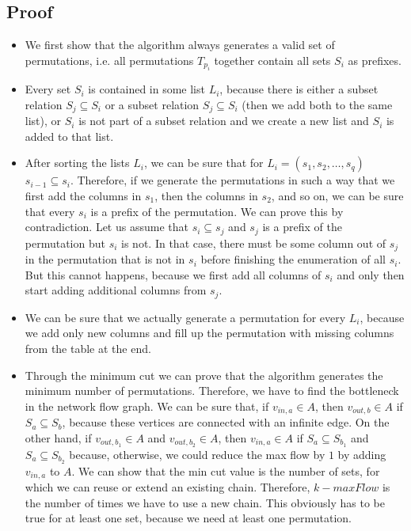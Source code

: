 \documentclass[12pt]{article}
\begin{document}
\subsection*{Proof}
\begin{itemize}
	\item We first show that the algorithm always generates a valid set of permutations, i.e. all permutations $T_{p_i}$ together contain all sets $S_i$ as prefixes.
	\item Every set $S_i$ is contained in some list $L_i$, because there is either a subset relation $S_j \subseteq S_i$ or a subset relation $S_j \subseteq S_i$ (then we add both to the same list), or $S_i$ is not part of a subset relation and we create a new list and $S_i$ is added to that list.
	\item After sorting the lists $L_i$, we can be sure that for $L_i = (s_1, s_2, \ldots, s_q)$ $s_{i-1} \subseteq s_i$. Therefore, if we generate the permutations in such a way that we first add the columns in $s_1$, then the columns in $s_2$, and so on, we can be sure that every $s_i$ is a prefix of the permutation. We can prove this by contradiction. Let us assume that $s_i \subseteq s_j$ and $s_j$ is a prefix of the permutation but $s_i$ is not. In that case, there must be some column out of $s_j$ in the permutation that is not in $s_i$ before finishing the enumeration of all $s_i$. But this cannot happens, because we first add all columns of $s_i$ and only then start adding additional columns from $s_j$.
	\item We can be sure that we actually generate a permutation for every $L_i$, because we add only new columns and fill up the permutation with missing columns from the table at the end.
	\item Through the minimum cut we can prove that the algorithm generates the minimum number of permutations. Therefore, we have to find the bottleneck in the network flow graph. We can be sure that, if $v_{\mathit{in}, a} \in A$, then $v_{\mathit{out},b} \in A$ if $S_a \subseteq S_b$, because these vertices are connected with an infinite edge. On the other hand, if $v_{\mathit{out}, b_1} \in A$ and $v_{\mathit{out}, b_2} \in A$, then $v_{\mathit{in}, a} \in A$ if $S_a \subseteq S_{b_1}$ and $S_a \subseteq S_{b_2}$ because, otherwise, we could reduce the max flow by $1$ by adding $v_{\mathit{in},a}$ to $A$. We can show that the min cut value is the number of sets, for which we can reuse or extend an existing chain. Therefore, $k-\mathit{maxFlow}$ is the number of times we have to use a new chain. This obviously has to be true for at least one set, because we need at least one permutation.
\end{itemize}
\end{document}
